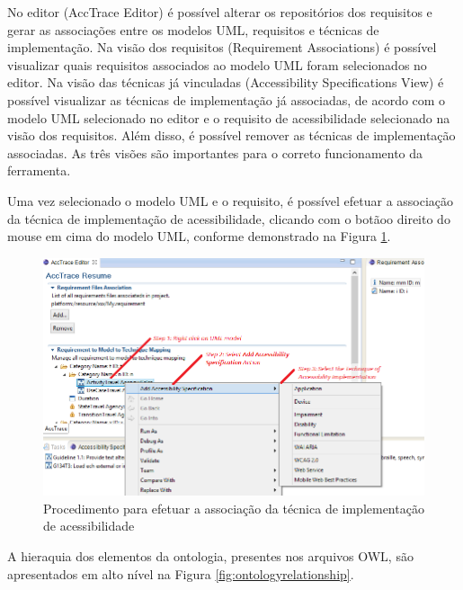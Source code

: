 \documentclass[runningheads,a4paper]{llncs}
\begin{document}
No editor (AccTrace Editor) é possível alterar os repositórios dos requisitos e gerar as associações entre os modelos UML, requisitos e técnicas de implementação. Na visão
dos requisitos (Requirement Associations) é possível visualizar quais requisitos associados
ao modelo UML foram selecionados no editor. Na visão das técnicas já vinculadas
(Accessibility Specifications View) é possível visualizar as técnicas de implementação já
associadas, de acordo com o modelo UML selecionado no editor e o requisito de acessibilidade
selecionado na visão dos requisitos. Além disso, é possível remover as técnicas de
implementação associadas. As três visões são importantes para o correto funcionamento
da ferramenta.

Uma vez selecionado o modelo UML e o requisito, é possível efetuar a associação da
técnica de implementação de acessibilidade, clicando com o botãoo direito do mouse em
cima do modelo UML, conforme demonstrado na Figura \ref{fig:rightclick}.

\begin{figure}[h!]
\centering
\includegraphics[scale=0.25]{./img/rightclick.png}
\caption{Procedimento para efetuar a associação da técnica de implementação de
acessibilidade}
\label{fig:rightclick}
\end{figure}

A hieraquia dos elementos da ontologia, presentes nos arquivos OWL, são apresentados em alto nível na Figura \ref{fig:ontologyrelationship}.
\end{document}
